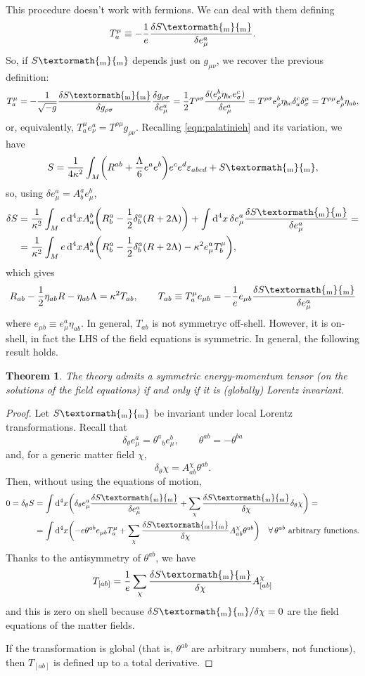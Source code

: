 \documentclass[a4paper,12pt]{book}
\newcommand{\ped}[1]{\textormath{\textsubscript{#1}}{_{\mathrm{#1}}}}
\newcommand{\dd}{\mathop{\mathrm{d}\!}{}}
\newtheorem{theorem}{Theorem}
\theoremstyle{definition}
\theoremstyle{remark}
\begin{document}
This procedure doesn't work with fermions. We can deal with them defining
\[T^\mu_a\equiv-\frac1e\frac{\delta S\ped{m}}{\delta e^a_\mu}.\]
So, if $S\ped{m}$ depends just on $g_{\mu\nu}$, we recover the previous definition:
\[T^\mu_a=-\frac1{\sqrt{-g}}\frac{\delta S\ped{m}}{\delta g_{\rho\sigma}}\frac{\delta g_{\rho\sigma}}{\delta e^a_\mu}=\frac12T^{\rho\sigma}\frac{\delta(e^b_\rho\eta_{bc}e^c_\sigma)}{\delta e^a_{\mu}}=T^{\rho\sigma}e^b_\rho\eta_{bc}\delta^c_a\delta^\mu_\sigma=T^{\rho\mu}e_\rho^b\eta_{ab},\]
or, equivalently, $T^\mu_ae^a_\nu=T^{\rho\mu}g_{\rho\nu}$. Recalling \cref{eqn:palatinieh} and its variation, we have
\[S=\frac{1}{4\kappa^2}\int_M\biggl(R^{ab}+\frac{\Lambda}{6}e^ae^b\biggr)e^ce^d\varepsilon_{abcd}+S\ped{m},\]
so, using $\delta e^a_\mu=A^a_be^b_\mu$,
\begin{align*}
\delta S&=\frac1{\kappa^2}\int_Me\dd^4xA^b_a\biggl(R^a_b-\frac12\delta^a_b(R+2\Lambda)\biggr)+\int\dd^4x\,\delta e^a_\mu\frac{\delta S\ped{m}}{\delta e^a_\mu}=\\
&=\frac1{\kappa^2}\int_Me\dd^4xA^b_a\biggl(R^a_b-\frac12\delta^a_b(R+2\Lambda)-\kappa^2e^a_\mu T^\mu_b\biggr),
\end{align*}
which gives
\[R_{ab}-\frac12\eta_{ab}R-\eta_{ab}\Lambda=\kappa^2T_{ab},\qquad T_{ab}\equiv T^\mu_ae_{\mu b}=-\frac1ee_{\mu b}\frac{\delta S\ped{m}}{\delta e^a_\mu}\]
where $e_{\mu b}\equiv e^a_\mu\eta_{ab}$. In general, $T_{ab}$ is not symmetryc off-shell. However, it is on-shell, in fact the LHS of the field equations is symmetric. In general, the following result holds.

\begin{theorem}
The theory admits a symmetric energy-momentum tensor (on the solutions of the field equations) if and only if it is (globally) Lorentz invariant.
\end{theorem}
\begin{proof}
Let $S\ped{m}$ be invariant under local Lorentz transformations. Recall that
\[\delta_\theta e^a_\mu=\theta^a{}_be^b_\mu,\qquad \theta^{ab}=-\theta^{ba}\]
and, for a generic matter field $\chi$,
\[\delta_\theta\chi=A^\chi_{ab}\theta^{ab}.\]
Then, without using the equations of motion,
\begin{align*}
0=\delta_\theta S&=\int\dd^4x\biggl(\delta_\theta e^a_\mu\frac{\delta S\ped{m}}{\delta e^a_\mu}+\sum_\chi \frac{\delta S\ped{m}}{\delta\chi}\delta_\theta\chi\biggr)=\\
&=\int\dd^4x\biggl(-e\theta^{ab}e_{\mu b}T^\mu_a+\sum_\chi\frac{\delta S\ped{m}}{\delta\chi}A^\chi_{ab}\theta^{ab}\biggr)\quad\forall\,\theta^{ab}\text{ arbitrary functions.}
\end{align*}
Thanks to the antisymmetry of $\theta^{ab}$, we have
\[T_{[ab]}=\frac1e\sum_\chi\frac{\delta S\ped{m}}{\delta\chi}A^\chi_{[ab]}\]
and this is zero on shell because $\delta S\ped{m}/\delta\chi=0$ are the field equations of the matter fields.

If the transformation is global (that is, $\theta^{ab}$ are arbitrary numbers, not functions), then $T_{[ab]}$ is defined up to a total derivative.
\end{proof}
\end{document}
